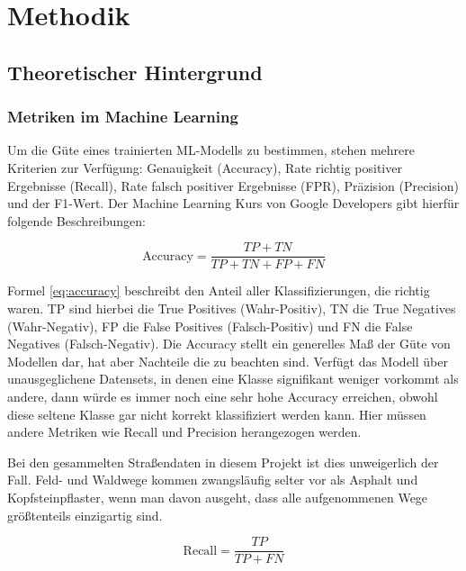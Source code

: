 \chapter{Methodik}\label{ch:method}

\section{Theoretischer Hintergrund}
\subsection{Metriken im Machine Learning}
Um die Güte eines trainierten ML-Modells zu bestimmen, stehen mehrere Kriterien zur Verfügung: Genauigkeit (Accuracy), Rate richtig positiver Ergebnisse (Recall), Rate falsch positiver Ergebnisse (FPR), Präzision (Precision) und der F1-Wert. Der Machine Learning Kurs von Google Developers gibt hierfür folgende Beschreibungen:

\begin{equation}
    \text{Accuracy} = \frac{TP + TN}{TP + TN + FP + FN}
    \label{eq:accuracy}
\end{equation}

Formel \ref{eq:accuracy} beschreibt den Anteil aller Klassifizierungen, die richtig waren. TP sind hierbei die True Positives (Wahr-Positiv), TN die True Negatives (Wahr-Negativ), FP die False Positives (Falsch-Positiv) und FN die False Negatives (Falsch-Negativ). Die Accuracy stellt ein generelles Maß der Güte von Modellen dar, hat aber Nachteile die zu beachten sind. Verfügt das Modell über unausgeglichene Datensets, in denen eine Klasse signifikant weniger vorkommt als andere, dann würde es immer noch eine sehr hohe Accuracy erreichen, obwohl diese seltene Klasse gar nicht korrekt klassifiziert werden kann. Hier müssen andere Metriken wie Recall und Precision herangezogen werden. \cite{GoogleML2026} 

Bei den gesammelten Straßendaten in diesem Projekt ist dies unweigerlich der Fall. Feld- und Waldwege kommen zwangsläufig selter vor als Asphalt und Kopfsteinpflaster, wenn man davon ausgeht, dass alle aufgenommenen Wege größtenteils einzigartig sind.

\begin{equation}
    \text{Recall} = \frac{TP}{TP + FN}
    \label{eq:recall}
\end{equation}

